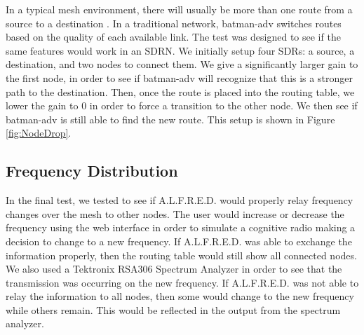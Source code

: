 In a typical mesh environment, there will usually be more than one route from a source to a destination \cite{Akyildiz2009810}. In a traditional network, batman-adv switches routes based on the quality of each available link. The test was designed to see if the same features would work in an SDRN. We initially setup four SDRs: a source, a destination, and two nodes to connect them. We give a significantly larger gain to the first node, in order to see if batman-adv will recognize that this is a stronger path to the destination. Then, once the route is placed into the routing table, we lower the gain to 0 in order to force a transition to the other node. We then see if batman-adv is still able to find the new route. This setup is shown in Figure \ref{fig:NodeDrop}.



\subsection{Frequency Distribution}

In the final test, we tested to see if A.L.F.R.E.D. would properly relay frequency changes over the mesh to other nodes. The user would increase or decrease the frequency using the web interface in order to simulate a cognitive radio making a decision to change to a new frequency. If A.L.F.R.E.D. was able to exchange the information properly, then the routing table would still show all connected nodes. We also used a Tektronix RSA306 Spectrum Analyzer in order to see that the transmission was occurring on the new frequency. If A.L.F.R.E.D. was not able to relay the information to all nodes, then some would change to the new frequency while others remain. This would be reflected in the output from the spectrum analyzer. 




